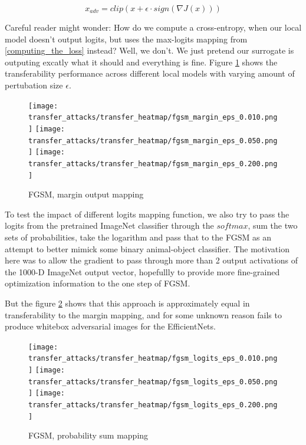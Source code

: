 $$x_{adv} = clip(x + \epsilon \cdot sign(\nabla J(x)))$$


Careful reader might wonder: How do we compute a cross-entropy, when our local model doesn't output logits, but uses the max-logits mapping from \ref{computing_the_loss} instead? Well, we don't. We just pretend our surrogate is outputing excatly what it should and everything is fine. Figure \ref{fig:fgsm_margin} shows the transferability performance across different local models with varying amount of pertubation size $\epsilon$.

\begin{figure}[!htb]
  \texttt{[image: transfer\_attacks/transfer\_heatmap/fgsm\_margin\_eps\_0.010.png]}
\endminipage\hfill
{}
  \texttt{[image: transfer\_attacks/transfer\_heatmap/fgsm\_margin\_eps\_0.050.png]}
\endminipage\hfill
{}%
  \texttt{[image: transfer\_attacks/transfer\_heatmap/fgsm\_margin\_eps\_0.200.png]}
\endminipage
\caption{FGSM, margin output mapping}
\label{fig:fgsm_margin}
\end{figure}

To test the impact of different logits mapping function, we also try to pass the logits from the pretrained ImageNet classifier through the $softmax$, sum the two sets of probabilities, take the logarithm and pass that to the FGSM as an attempt to better mimick some binary animal-object classifier. The motivation here was to allow the gradient to pass through more than 2 output activations of the 1000-D ImageNet output vector, hopefullly to provide more fine-grained optimization information to the one step of FGSM.

But the figure \ref{fig:fgsm_prob_sum} shows that this approach is approximately equal in transferability to the margin mapping, and for some unknown reason fails to produce whitebox adversarial images for the EfficientNets.

\begin{figure}[!htb]
  \texttt{[image: transfer\_attacks/transfer\_heatmap/fgsm\_logits\_eps\_0.010.png]}
\endminipage\hfill
{}
  \texttt{[image: transfer\_attacks/transfer\_heatmap/fgsm\_logits\_eps\_0.050.png]}
\endminipage\hfill
{}%
  \texttt{[image: transfer\_attacks/transfer\_heatmap/fgsm\_logits\_eps\_0.200.png]}
\endminipage
\caption{FGSM, probability sum mapping}
\label{fig:fgsm_prob_sum}
\end{figure}


